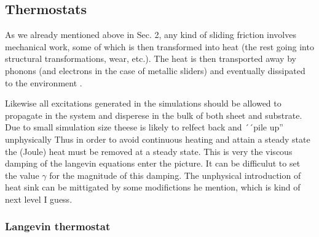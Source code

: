 

\subsection{Thermostats}

As we already mentioned above in Sec. 2, any kind of sliding friction involves mechanical work, some of which is then transformed into heat (the rest going into structural transformations, wear, etc.). The heat is then transported away by phonons (and electrons in the case of metallic sliders) and eventually dissipated to the environment \cite{Manini_2016}.



Likewise all excitations generated in the simulations should be allowed to propagate in the system and disperese in the bulk of both sheet and substrate. Due to small simulation size theese is likely to relfect back and ´´pile up'' unphysically Thus in order to avoid continuous heating and attain a steady state the (Joule) heat must be removed at a steady state. This is very the viscous damping of the langevin equations enter the picture. It can be difficulut to set the value $\gamma$ for the magnitude of this damping. The unphysical introduction of heat sink can be mittigated by some modifictions he mention, which is kind of next level I guess. 


\subsubsection*{Langevin thermostat}


